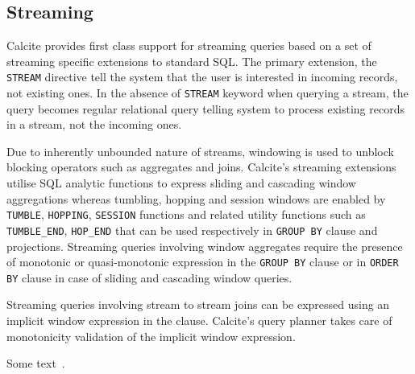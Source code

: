 \subsection{Streaming}
\label{subsec:streaming}

Calcite provides first class support for streaming queries based on a set of streaming specific extensions to standard SQL. The primary extension, the \texttt{STREAM} directive tell the system that the user is interested in incoming records, not existing ones. In the absence of \texttt{STREAM} keyword when querying a stream, the query becomes regular relational query telling system to process existing records in a stream, not the incoming ones. 

Due to inherently unbounded nature of streams, windowing is used to unblock blocking operators such as aggregates and joins. Calcite's streaming extensions utilise SQL analytic functions to express sliding and cascading window aggregations whereas tumbling, hopping and session windows are enabled by \texttt{TUMBLE}, \texttt{HOPPING}, \texttt{SESSION} functions and related utility functions such as \texttt{TUMBLE\_END}, \texttt{HOP\_END} that can be used respectively in \texttt{GROUP BY} clause and projections. Streaming queries involving window aggregates require the presence of monotonic or quasi-monotonic expression in the \texttt{GROUP BY} clause or in \texttt{ORDER BY} clause in case of sliding and cascading window queries.

Streaming queries involving stream to stream joins can be expressed using an implicit window expression in the  clause. Calcite's query  planner takes care of monotonicity validation of the implicit window expression.

Some text~\cite{DBLP:journals/cacm/Hyde10}.

